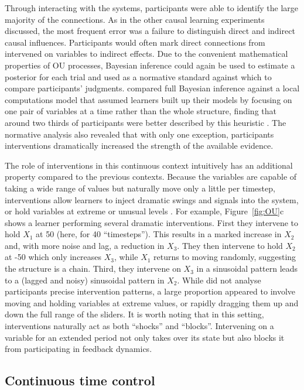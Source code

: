 \documentclass{cambridge7A}%
\begin{document}
Through interacting with the systems, participants were able to identify the large majority of the connections.  As in the other causal learning experiments discussed, the most frequent error was a failure to distinguish direct and indirect causal influences.  Participants would often mark direct connections from intervened on variables to indirect effects.  Due to the convenient mathematical properties of OU processes, Bayesian inference could again be used to estimate a posterior for each trial and used as a normative standard against which to compare participants' judgments.  \cite{davis2018ctcv} compared full Bayesian inference against a local computations model that assumed learners built up their models by focusing on one pair of variables at a time rather than the whole structure, finding that around two thirds of participants were better described by this heuristic \citep[cf][]{fernbach2009causal}.  The normative analysis also revealed that with only one exception, participants interventions dramatically increased the strength of the available evidence.

The role of interventions in this continuous context intuitively has an additional property compared to the previous contexts.  Because the variables are capable of taking a wide range of values but naturally move only a little per timestep, interventions allow learners to inject dramatic swings and signals into the system, or hold variables at extreme or unusual levels \citep[Figure~\ref{fig:OU},][]{davis2018ctcv}.  For example, Figure~\ref{fig:OU}c shows a learner performing several dramatic interventions.  First they intervene to hold $X_1$ at 50 (here, for 40 ``timesteps'').  This results in a marked increase in $X_2$ and, with more noise and lag, a reduction in $X_3$.  They then intervene to hold $X_2$ at -50 which only increases $X_3$, while $X_1$ returns to moving randomly, suggesting the structure is a chain.  Third, they intervene on $X_3$ in a sinusoidal pattern leads to a (lagged and noisy) sinusoidal pattern in $X_2$.  While \cite{davis2018ctcv} did not analyse participants precise intervention patterns, a large proportion appeared to involve moving and holding variables at extreme values, or rapidly dragging them up and down the full range of the sliders.  It is worth noting that in this setting, interventions naturally act as both ``shocks'' and ``blocks''.  Intervening on a variable for an extended period not only takes over its state but also blocks it from participating in feedback dynamics.

\subsection{Continuous time control}
\end{document}
